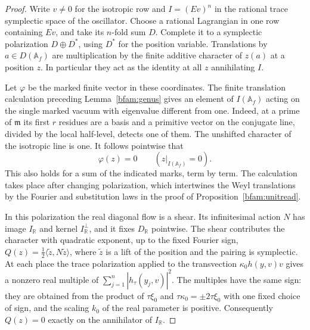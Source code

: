 \begin{proof}
Write \(v\ne0\) for the isotropic row and \(I=(Ev)^n\) in the
rational trace symplectic space of the oscillator. Choose a rational
Lagrangian in one row containing \(Ev\), and take its \(n\)-fold sum
\(D\). Complete it to a symplectic polarization \(D\oplus D^*\),
using \(D^*\) for the position variable. Translations by \(a\in
D(\mathbb A_f)\) are multiplication by the finite additive character
of \(z(a)\) at a position \(z\). In particular they act as the identity
at all \(z\) annihilating \(I\).

Let \(\varphi\) be the marked finite vector in these coordinates.
The finite translation calculation preceding Lemma~\ref{bfam:genus}
gives an element of \(I(\mathbb A_f)\) acting on the single marked
vacuum with eigenvalue different from one. Indeed, at a prime of
\(\mathfrak m\) its first \(r\) residues are a basis and a primitive
vector on the conjugate line, divided by the local half-level,
detects one of them. The unshifted character of the isotropic line
is one. It follows pointwise that
\[
                 \varphi(z)=0\qquad (z|_{I(\mathbb A_f)}=0).
\]
This also holds for a sum of the indicated marks, term by term. The
calculation takes place after changing polarization, which intertwines
the Weyl translations by the Fourier and substitution laws in the
proof of Proposition~\ref{bfam:unitread}.

In this polarization the real diagonal flow is a shear. Its
infinitesimal action \(N\) has image \(I_{\mathbb R}\) and kernel
\(I_{\mathbb R}^{\perp}\), and it fixes \(D_{\mathbb R}\) pointwise.
The shear contributes the character with quadratic exponent,
up to the fixed Fourier sign, \(Q(z)=\tfrac12\langle \widetilde
z,N\widetilde z\rangle\), where \(\widetilde z\) is a lift of the
position and the pairing is symplectic. At each place the trace
polarization applied to the transvection
\(\kappa_0 h(y,v)v\) gives a nonzero real multiple of
\(\sum_{j=1}^n|h_\tau(y_j,v)|^2\). The multiples have the same sign:
they are obtained from the product of \(\tau\xi_0\) and
\(\tau\kappa_0=\pm2\tau\xi_0\) with one fixed choice of sign, and
the scaling \(k_0\) of the real parameter is positive. Consequently
\(Q(z)=0\) exactly on the annihilator of \(I_{\mathbb R}\).


\end{proof}
